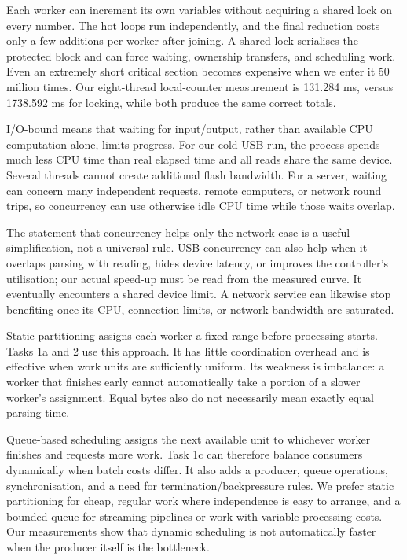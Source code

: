 Each worker can increment its own variables without acquiring a shared lock on every number. The hot loops run independently, and the final reduction costs only a few additions per worker after joining. A shared lock serialises the protected block and can force waiting, ownership transfers, and scheduling work. Even an extremely short critical section becomes expensive when we enter it 50 million times. Our eight-thread local-counter measurement is 131.284 ms, versus 1738.592 ms for locking, while both produce the same correct totals.

I/O-bound means that waiting for input/output, rather than available CPU computation alone, limits progress. For our cold USB run, the process spends much less CPU time than real elapsed time and all reads share the same device. Several threads cannot create additional flash bandwidth. For a server, waiting can concern many independent requests, remote computers, or network round trips, so concurrency can use otherwise idle CPU time while those waits overlap.

The statement that concurrency helps only the network case is a useful simplification, not a universal rule. USB concurrency can also help when it overlaps parsing with reading, hides device latency, or improves the controller's utilisation; our actual speed-up must be read from the measured curve. It eventually encounters a shared device limit. A network service can likewise stop benefiting once its CPU, connection limits, or network bandwidth are saturated.

Static partitioning assigns each worker a fixed range before processing starts. Tasks 1a and 2 use this approach. It has little coordination overhead and is effective when work units are sufficiently uniform. Its weakness is imbalance: a worker that finishes early cannot automatically take a portion of a slower worker's assignment. Equal bytes also do not necessarily mean exactly equal parsing time.

Queue-based scheduling assigns the next available unit to whichever worker finishes and requests more work. Task 1c can therefore balance consumers dynamically when batch costs differ. It also adds a producer, queue operations, synchronisation, and a need for termination/backpressure rules. We prefer static partitioning for cheap, regular work where independence is easy to arrange, and a bounded queue for streaming pipelines or work with variable processing costs. Our measurements show that dynamic scheduling is not automatically faster when the producer itself is the bottleneck.
